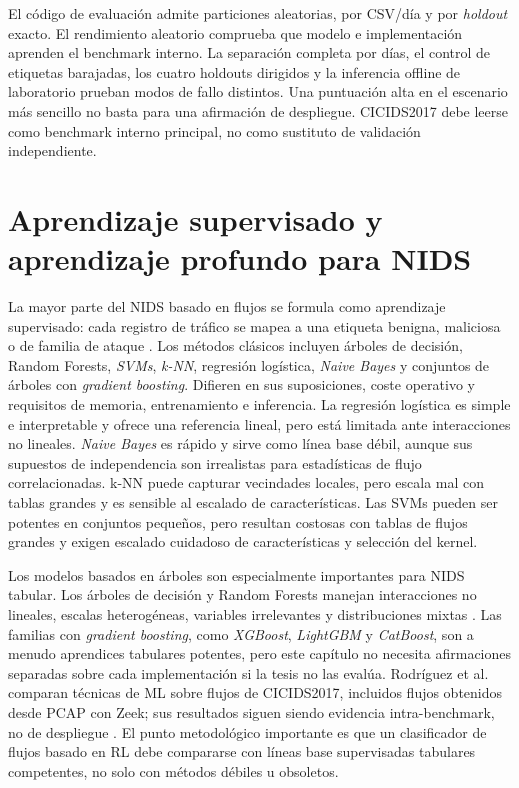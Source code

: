 El código de evaluación admite particiones aleatorias, por CSV/día y por \emph{holdout} exacto. El rendimiento aleatorio comprueba que modelo e implementación aprenden el benchmark interno. La separación completa por días, el control de etiquetas barajadas, los cuatro holdouts dirigidos y la inferencia offline de laboratorio prueban modos de fallo distintos. Una puntuación alta en el escenario más sencillo no basta para una afirmación de despliegue. CICIDS2017 debe leerse como benchmark interno principal, no como sustituto de validación independiente.

\section{Aprendizaje supervisado y aprendizaje profundo para NIDS}

La mayor parte del NIDS basado en flujos se formula como aprendizaje supervisado: cada registro de tráfico se mapea a una etiqueta benigna, maliciosa o de familia de ataque \parencite{LiuLang2019IDSSurvey,Ahmad2021}. Los métodos clásicos incluyen árboles de decisión, Random Forests, \textit{SVMs}, \textit{k-NN}, regresión logística, \textit{Naive Bayes} y conjuntos de árboles con \textit{gradient boosting}. Difieren en sus suposiciones, coste operativo y requisitos de memoria, entrenamiento e inferencia. La regresión logística es simple e interpretable y ofrece una referencia lineal, pero está limitada ante interacciones no lineales. \textit{Naive Bayes} es rápido y sirve como línea base débil, aunque sus supuestos de independencia son irrealistas para estadísticas de flujo correlacionadas. k-NN puede capturar vecindades locales, pero escala mal con tablas grandes y es sensible al escalado de características. Las SVMs pueden ser potentes en conjuntos pequeños, pero resultan costosas con tablas de flujos grandes y exigen escalado cuidadoso de características y selección del kernel.

Los modelos basados en árboles son especialmente importantes para NIDS tabular. Los árboles de decisión y Random Forests manejan interacciones no lineales, escalas heterogéneas, variables irrelevantes y distribuciones mixtas \parencite{LiuLang2019IDSSurvey,Apruzzese2022CrossEvaluationNIDS}. Las familias con \textit{gradient boosting}, como \textit{XGBoost}, \textit{LightGBM} y \textit{CatBoost}, son a menudo aprendices tabulares potentes, pero este capítulo no necesita afirmaciones separadas sobre cada implementación si la tesis no las evalúa. Rodríguez et al. comparan técnicas de ML sobre flujos de CICIDS2017, incluidos flujos obtenidos desde PCAP con Zeek; sus resultados siguen siendo evidencia intra-benchmark, no de despliegue \parencite{Rodriguez2022FlowBasedEval}. El punto metodológico importante es que un clasificador de flujos basado en RL debe compararse con líneas base supervisadas tabulares competentes, no solo con métodos débiles u obsoletos.

